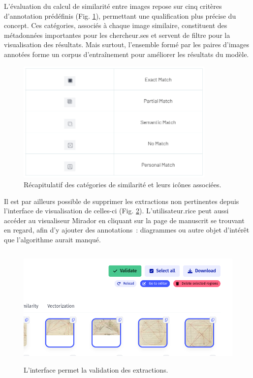 L'évaluation du calcul de similarité entre images repose sur cinq
critères d'annotation prédéfinis (Fig. \ref{fig:cat}), permettant une qualification plus
précise du concept. Ces catégories, associés à chaque image similaire,
constituent des métadonnées importantes pour les chercheur.ses et servent
de filtre pour la visualisation des résultats. Mais surtout, l'ensemble
formé par les paires d'images annotées forme un corpus d'entraînement
pour améliorer les résultats du modèle.

\begin{figure}[H]
          \begin{center}
          \includegraphics[height=6cm]{figues/recap_categories.png}
          \end{center}
          \caption{Récapitulatif des catégories de similarité et leurs icônes associées.}
          \label{fig:cat} \end{figure}

Il est par ailleurs possible de supprimer les extractions non
pertinentes depuis l'interface de visualisation de celles-ci (Fig. \ref{fig:correct}).
L'utilisateur.rice peut aussi accéder au visualiseur Mirador en cliquant sur
la page de manuscrit se trouvant en regard, afin d'y ajouter des annotations~:  diagrammes ou autre objet d'intérêt que l'algorithme aurait
manqué.

\begin{figure}[H]
          \begin{center}
          \includegraphics[height=6cm]{figues/annotation.png}
          \end{center}
          \caption{L'interface permet la validation des extractions.}
          \label{fig:correct} \end{figure}

